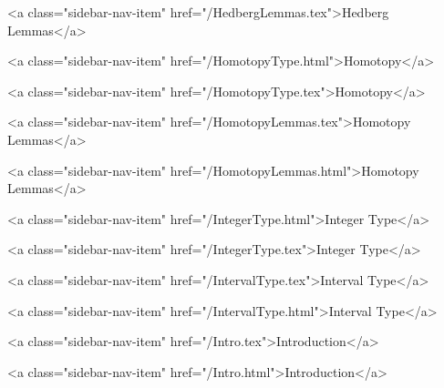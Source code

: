       
    
      
        
          <a class="sidebar-nav-item" href="/HedbergLemmas.tex">Hedberg Lemmas</a>
        
      
    
      
        
          <a class="sidebar-nav-item" href="/HomotopyType.html">Homotopy</a>
        
      
    
      
        
          <a class="sidebar-nav-item" href="/HomotopyType.tex">Homotopy</a>
        
      
    
      
        
          <a class="sidebar-nav-item" href="/HomotopyLemmas.tex">Homotopy Lemmas</a>
        
      
    
      
        
          <a class="sidebar-nav-item" href="/HomotopyLemmas.html">Homotopy Lemmas</a>
        
      
    
      
        
          <a class="sidebar-nav-item" href="/IntegerType.html">Integer Type</a>
        
      
    
      
        
          <a class="sidebar-nav-item" href="/IntegerType.tex">Integer Type</a>
        
      
    
      
        
          <a class="sidebar-nav-item" href="/IntervalType.tex">Interval Type</a>
        
      
    
      
        
          <a class="sidebar-nav-item" href="/IntervalType.html">Interval Type</a>
        
      
    
      
        
          <a class="sidebar-nav-item" href="/Intro.tex">Introduction</a>
        
      
    
      
        
          <a class="sidebar-nav-item" href="/Intro.html">Introduction</a>
        
